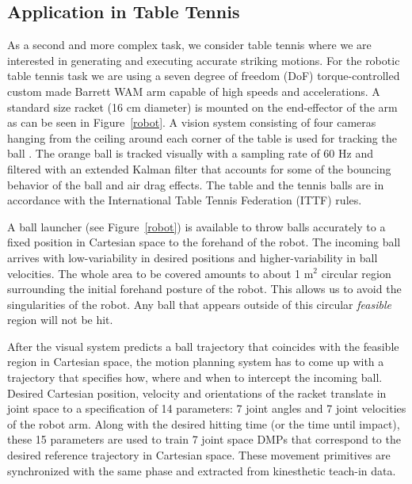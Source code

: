 \subsection{Application in Table Tennis}


As a second and more complex task, we consider table tennis where we are interested in generating and executing accurate striking motions. For the robotic table tennis task we are using a seven degree of freedom (DoF) torque-controlled custom made Barrett WAM arm capable of high speeds and accelerations. A standard size racket (16 cm diameter) is mounted on the end-effector of the arm as can be seen in Figure~\ref{robot}. A vision system consisting of four cameras hanging from the ceiling around each corner of the table is used for tracking the ball \cite{Lampert12}. The orange ball is tracked  visually with a sampling rate of 60 Hz and filtered with an extended Kalman filter that accounts for some of the bouncing behavior of the ball and air drag effects. The table and the tennis balls are in accordance with the International Table Tennis Federation (ITTF) rules.

A ball launcher (see Figure~\ref{robot}) is available to throw balls accurately to a fixed position in Cartesian space to the forehand of the robot. The incoming ball arrives with low-variability in desired positions and higher-variability in ball velocities. The whole area to be covered amounts to about 1 m$^2$ circular region surrounding the initial forehand posture of the robot. This allows us to avoid the singularities of the robot. Any ball that appears outside of this circular \emph{feasible} region will not be hit.

After the visual system predicts a ball trajectory that coincides with the feasible region in Cartesian space, the motion planning system has to come up with a trajectory that specifies how, where and when to intercept the incoming ball. Desired Cartesian position, velocity and orientations of the racket translate in joint space to a specification of 14 parameters: 7 joint angles and 7 joint velocities of the robot arm. Along with the desired hitting time (or the time until impact), these 15 parameters are used to train 7 joint space DMPs that correspond to the desired reference trajectory in Cartesian space. These movement primitives are synchronized with the same phase and extracted from kinesthetic teach-in data.

